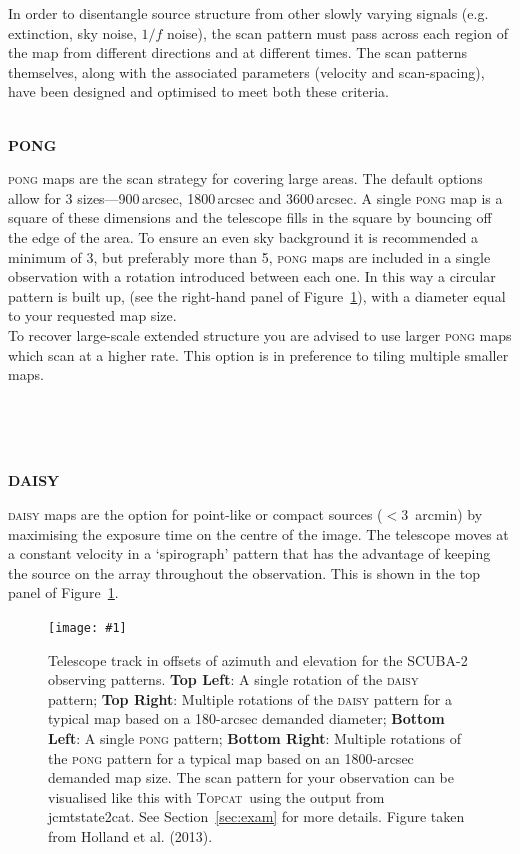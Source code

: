 \documentclass[twoside,11pt]{article}
\newcommand{\htmladdnormallink}[2]{#1}
\newcommand{\htmladdimg}[1]{}
\newcommand{\htmlref}[2]{#1}
\newcommand{\latexhtml}[2]{#1}
\newcommand{\xref}[3]{#1}
\renewcommand{\_}{\texttt{\symbol{95}}}
\newcommand{\topcat}{\htmladdnormallink{\textsc{Topcat}}{http://www.starlink.ac.uk/topcat}}
\newcommand{\task}[1]{\textsf{#1}}
\newcommand{\jcmtstate}{\xref{\task{jcmtstate2cat}}{sun258}{JCMTSTATE2CAT}}
\newcommand{\myfig}[5]{
  \begin{figure}#2
    \centering\texttt{[image: \#1]}
    \typeout{#1.eps inserted on page \arabic{page}}
    \caption{\label{#4}\small #5}
  \end{figure}
}
\newcommand{\myfig}[5]{
    \label{#4} \htmladdimg{#1.png}\\
    \\
    Figure: #5\\
  }
\newcommand{\cref}[3]{\latexhtml{#1~\ref{#2}}{\htmlref{#3}{#2}}}
\begin{document}
In order to disentangle source structure from other
slowly varying signals (e.g. extinction, sky noise, $1/f$ noise), the
scan pattern must pass across each region of the map from different
directions and at different times. The scan patterns themselves, along
with the associated parameters (velocity and scan-spacing), have been
designed and optimised to meet both these criteria.
\\ \\
\begin{minipage}[t]{0.12\linewidth}
\textbf{PONG}
\end{minipage}
\begin{minipage}[t]{0.85\linewidth}\textsc{pong} maps are the scan
strategy for covering large areas. The default options allow for 3
sizes---900\,arcsec, 1800\,arcsec and 3600\,arcsec. A single \textsc{pong} map is
a square of these dimensions and the telescope fills in the square by
bouncing off the edge of the area. To ensure an even sky background it
is recommended a minimum of 3, but preferably more than 5,
\textsc{pong} maps are included in a single observation with a
rotation introduced between each one. In this way a circular pattern
is built up, (see the right-hand panel of \cref{Figure}{fig:scan}{graphic below}),
with a diameter equal to your requested map size.
\vspace{0.2cm}\\
To recover large-scale extended structure you are advised to use
larger \textsc{pong} maps which scan at a higher rate. This option is
in preference to tiling multiple smaller maps.
\end{minipage}
\\ \\ \\
\begin{minipage}[t]{0.12\linewidth}
\textbf{DAISY}
\end{minipage}
\begin{minipage}[t]{0.85\linewidth}
\textsc{daisy} maps are the option for point-like or compact sources
($<$3~arcmin) by maximising the exposure time on the centre of the
image. The telescope moves at a constant velocity in a `spirograph'
pattern that has the advantage of keeping the source on the array
throughout the observation. This is shown in the top panel of
\cref{Figure}{fig:scan}{the figure below}.
\end{minipage}

\myfig{sc21_wayne_scan}{[b!]}{width=0.9\linewidth}{fig:scan}{
  Telescope track in offsets of azimuth and elevation for the SCUBA-2
  observing patterns. \textbf{Top Left}: A single rotation of the
  \textsc{daisy} pattern; \textbf{Top Right}: Multiple rotations of
  the \textsc{daisy} pattern for a typical map based on a 180-arcsec
  demanded diameter; \textbf{Bottom Left}: A single \textsc{pong}
  pattern; \textbf{Bottom Right}: Multiple rotations of the
  \textsc{pong} pattern for a typical map based on an 1800-arcsec
  demanded map size. The scan pattern for your observation can be
  visualised like this with \topcat\ using the output from \jcmtstate.
  See \cref{Section}{sec:exam}{Examining raw data} for more details.
  Figure taken from Holland et al. (2013).}
\end{document}
